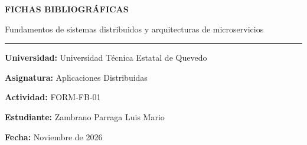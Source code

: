 \documentclass[11pt,a4paper]{article}
\begin{document}





\begin{center}

{\large\bfseries
FICHAS BIBLIOGRÁFICAS}

\vspace{3pt}

{\normalsize
Fundamentos de sistemas distribuidos
y arquitecturas de microservicios}

\vspace{5pt}

\rule{\linewidth}{0.8pt}

\end{center}

\textbf{Universidad:}
Universidad Técnica Estatal de Quevedo

\textbf{Asignatura:}
Aplicaciones Distribuidas

\textbf{Actividad:}
FORM-FB-01

\textbf{Estudiante:}
Zambrano Parraga Luis Mario

\textbf{Fecha:}
Noviembre de 2026

\vspace{7pt}

\end{document}
